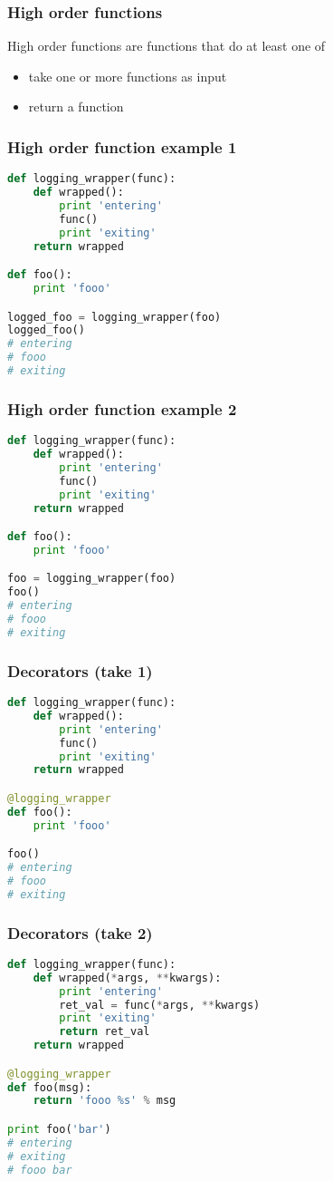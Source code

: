\documentclass{beamer}
\begin{document}
\begin{frame}[fragile]
\frametitle{High order functions}
High order functions are functions that do at least one of
\begin{itemize}
  \item take one or more functions as input
  \item return a function
\end{itemize}
\end{frame}

\begin{frame}[fragile]
\frametitle{High order function example 1}
\begin{lstlisting}[language=python]
def logging_wrapper(func):
    def wrapped():
        print 'entering'
        func()
        print 'exiting'
    return wrapped

def foo():
    print 'fooo'

logged_foo = logging_wrapper(foo)
logged_foo()
# entering
# fooo
# exiting
\end{lstlisting}
\end{frame}

\begin{frame}[fragile]
\frametitle{High order function example 2}
\begin{lstlisting}[language=python]
def logging_wrapper(func):
    def wrapped():
        print 'entering'
        func()
        print 'exiting'
    return wrapped

def foo():
    print 'fooo'

foo = logging_wrapper(foo)
foo()
# entering
# fooo
# exiting
\end{lstlisting}
\end{frame}


\begin{frame}[fragile]
\frametitle{Decorators (take 1)}
\begin{lstlisting}[language=python]
def logging_wrapper(func):
    def wrapped():
        print 'entering'
        func()
        print 'exiting'
    return wrapped

@logging_wrapper
def foo():
    print 'fooo'

foo()
# entering
# fooo
# exiting
\end{lstlisting}
\end{frame}

\begin{frame}[fragile]
\frametitle{Decorators (take 2)}
\begin{lstlisting}[language=python]
def logging_wrapper(func):
    def wrapped(*args, **kwargs):
        print 'entering'
        ret_val = func(*args, **kwargs)
        print 'exiting'
        return ret_val
    return wrapped

@logging_wrapper
def foo(msg):
    return 'fooo %s' % msg

print foo('bar')
# entering
# exiting
# fooo bar
\end{lstlisting}
\end{frame}
\end{document}
